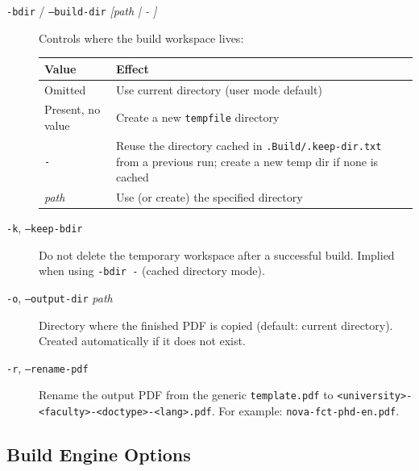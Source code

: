 \begin{description}
  \item[\texttt{-bdir} / \texttt{--build-dir} \textit{[path | - ]}]
        Controls where the build workspace lives:

        \begin{center}
        \renewcommand{\arraystretch}{1.25}
        \begin{tabular}{lp{9cm}}
          \hline
          \textbf{Value} & \textbf{Effect} \\
          \hline
          Omitted           & Use current directory (user mode default) \\
          Present, no value & Create a new \verb!tempfile! directory \\
          \texttt{-}        & Reuse the directory cached in
                              \verb!.Build/.keep-dir.txt! from a previous
                              run; create a new temp dir if none is cached \\
          \textit{path}     & Use (or create) the specified directory \\
          \hline
        \end{tabular}
        \end{center}

  \item[\texttt{-k}, \texttt{--keep-bdir}]
        Do not delete the temporary workspace after a successful build.
        Implied when using \texttt{-bdir -} (cached directory mode).

  \item[\texttt{-o}, \texttt{--output-dir} \textit{path}]
        Directory where the finished PDF is copied (default: current
        directory).  Created automatically if it does not exist.

  \item[\texttt{-r}, \texttt{--rename-pdf}]
        Rename the output PDF from the generic \verb!template.pdf! to
        \verb!<university>-<faculty>-<doctype>-<lang>.pdf!.  For example:
        \verb!nova-fct-phd-en.pdf!.
\end{description}

\subsection{Build Engine Options}
\label{sec:buildpy_engine_opts}

